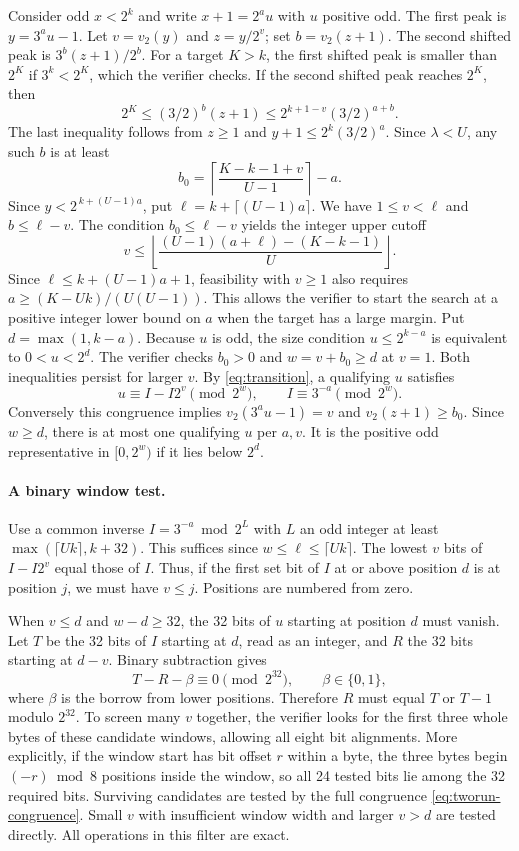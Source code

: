 \documentclass[11pt]{article}
\theoremstyle{definition}
\begin{document}
Consider odd \(x<2^k\) and write \(x+1=2^a u\) with \(u\)
positive odd. The first peak is \(y=3^a u-1\).
Let \(v=v_2(y)\) and \(z=y/2^v\); set \(b=v_2(z+1)\).
The second shifted peak is \(3^b(z+1)/2^b\).
For a target \(K>k\), the first shifted peak is smaller than
\(2^K\) if \(3^k<2^K\), which the verifier checks.
If the second shifted peak reaches \(2^K\), then
\[
 2^K\le(3/2)^b(z+1)\le 2^{k+1-v}(3/2)^{a+b}.
\]
The last inequality follows from \(z\ge1\) and \(y+1\le2^k(3/2)^a\).
Since \(\lambda<U\), any such \(b\) is at least
\[
 b_0=\left\lceil\frac{K-k-1+v}{U-1}\right\rceil-a .
\]
Since \(y<2^{\,k+(U-1)a}\), put \(\ell=k+\lceil(U-1)a\rceil\).
We have \(1\le v<\ell\) and \(b\le\ell-v\). The condition
\(b_0\le\ell-v\) yields the integer upper cutoff
\[
 v\le
 \left\lfloor\frac{(U-1)(a+\ell)-(K-k-1)}{U}\right\rfloor .
\]
Since \(\ell\le k+(U-1)a+1\), feasibility with \(v\ge1\)
also requires \(a\ge (K-Uk)/(U(U-1))\). This allows the
verifier to start the search at a positive integer lower bound
on \(a\) when the target has a large margin.
Put \(d=\max(1,k-a)\). Because \(u\) is odd, the size condition
\(u\le2^{k-a}\) is equivalent to \(0<u<2^d\). The verifier
checks \(b_0>0\) and \(w=v+b_0\ge d\) at \(v=1\).
Both inequalities persist for larger \(v\).
By \eqref{eq:transition}, a qualifying \(u\) satisfies
\begin{equation}\label{eq:tworun-congruence}
 u\equiv I-I2^v\pmod{2^w},\qquad I\equiv 3^{-a}\pmod{2^w}.
\end{equation}
Conversely this congruence implies \(v_2(3^a u-1)=v\)
and \(v_2(z+1)\ge b_0\). Since \(w\ge d\), there is at most
one qualifying \(u\) per \(a,v\). It is the positive odd
representative in \([0,2^w)\) if it lies below \(2^d\).

\paragraph{A binary window test.}
Use a common inverse \(I=3^{-a}\bmod 2^L\) with \(L\) an odd integer
at least \(\max(\lceil Uk\rceil,k+32)\). This suffices since
\(w\le\ell\le\lceil Uk\rceil\). The lowest \(v\) bits of
\(I-I2^v\) equal those of \(I\). Thus, if the first set bit
of \(I\) at or above position \(d\) is at position \(j\),
we must have \(v\le j\). Positions are numbered from zero.

When \(v\le d\) and \(w-d\ge32\), the 32 bits of \(u\) starting
at position \(d\) must vanish. Let \(T\) be the 32 bits of \(I\)
starting at \(d\), read as an integer, and \(R\) the 32 bits
starting at \(d-v\). Binary subtraction gives
\[
 T-R-\beta\equiv0\pmod{2^{32}},\qquad \beta\in\{0,1\},
\]
where \(\beta\) is the borrow from lower positions. Therefore
\(R\) must equal \(T\) or \(T-1\) modulo \(2^{32}\). To screen
many \(v\) together, the verifier looks for the first three
whole bytes of these candidate windows, allowing all eight
bit alignments. More explicitly, if the window start has bit
offset \(r\) within a byte, the three bytes begin
\((-r)\bmod8\) positions inside the window, so all 24 tested
bits lie among the 32 required bits. Surviving candidates are
tested by the full congruence \eqref{eq:tworun-congruence}.
Small \(v\) with insufficient window width and larger \(v>d\)
are tested directly. All operations in this filter are exact.
\end{document}

